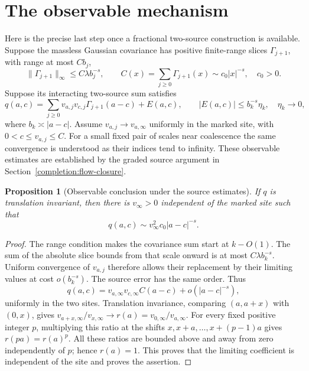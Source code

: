 \documentclass[11pt]{article}
\newtheorem{proposition}{Proposition}[section]
\begin{document}
\section{The observable mechanism}
\label{frac:sec:observables}
Here is the precise last step once a fractional two-source construction
is available. Suppose the massless Gaussian covariance has positive
finite-range slices \(\Gamma_{j+1}\), with range at most \(Cb_j\),
\[
 \|\Gamma_{j+1}\|_\infty\le C\lambda b_j^{-s},
 \qquad C(x)=\sum_{j\ge0}\Gamma_{j+1}(x)
                   \sim c_0|x|^{-s},\quad c_0>0.
\]
Suppose its interacting two-source sum satisfies
\begin{equation}\label{frac:eq:source-input}
 q(a,c)=\sum_{j\ge0}v_{a,j}v_{c,j}\Gamma_{j+1}(a-c)+E(a,c),
 \qquad |E(a,c)|\le b_k^{-s}\eta_k,
 \quad \eta_k\longrightarrow0,
\end{equation}
where \(b_k\asymp|a-c|\). Assume
\(v_{a,j}\to v_{a,\infty}\) uniformly in the marked site, with
\(0<c\le v_{a,j}\le C\). For a small fixed pair of scales near
coalescence the same convergence is understood as their indices tend
to infinity. These observable estimates are established by the graded source argument in Section~\ref{completion:flow-closure}.

\begin{proposition}[Observable conclusion under the source estimates]
\label{frac:prop:observable}
If \(q\) is translation invariant, then there is \(v_\infty>0\)
independent of the marked site such that
\[
 q(a,c)\sim v_\infty^2 c_0|a-c|^{-s}.
\]
\end{proposition}
\begin{proof}
The range condition makes the covariance sum start at \(k-O(1)\).
The sum of the absolute slice bounds from that scale onward is at most
\(C\lambda b_k^{-s}\). Uniform convergence of \(v_{a,j}\) therefore
allows their replacement by their limiting values at cost
\(o(b_k^{-s})\). The source error has the same order. Thus
\[
 q(a,c)=v_{a,\infty}v_{c,\infty}C(a-c)+o(|a-c|^{-s}),
\]
uniformly in the two sites.
Translation invariance, comparing \((a,a+x)\) with \((0,x)\), gives
\(v_{a+x,\infty}/v_{x,\infty}\to
r(a)=v_{0,\infty}/v_{a,\infty}\). For every fixed positive integer
\(p\), multiplying this ratio at the shifts \(x,x+a,\ldots,x+(p-1)a\)
gives \(r(pa)=r(a)^p\). All these ratios are bounded above and
away from zero independently of \(p\); hence \(r(a)=1\).
This proves that the limiting coefficient is independent of the site
and proves the assertion.
\end{proof}
\end{document}

